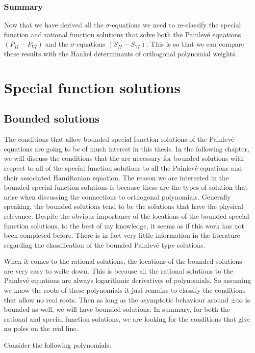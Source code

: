 \documentclass[12pt]{article}
\def\P{Painlev\'e }
\numberwithin{figure}{section}
\numberwithin{equation}{section}
\numberwithin{table}{section}
\begin{document}
\subsubsection{Summary}
Now that we have derived all the $\sigma$-equations we need to re-classify the special function and rational function solutions that solve both the \P equations $(P_{II}-P_{VI})$ and the $\sigma$-equations $(S_{II}-S_{VI})$. This is so that we can compare these results with the Hankel determinants of orthogonal polynomial weights.
\newpage\section{Special function solutions}
\subsection{Bounded solutions}
The conditions that allow bounded special function solutions of the \P equations are going to be of much interest in this thesis. In the following chapter, we will discuss the conditions that the are necessary for bounded solutions with respect to all of the special function solutions to all the \P equations and their associated Hamiltonian equation. The reason we are interested in the bounded special function solutions is because these are the types of solution that arise when discussing the connections to orthogonal polynomials. Generally speaking, the bounded solutions tend to be the solutions that have the physical relevance. Despite the obvious importance of the locations of the bounded special function solutions, to the best of my knowledge, it seems as if this work has not been completed before. There is in fact very little information in the literature regarding the classification of the bounded \P type solutions.

When it comes to the rational solutions, the locations of the bounded solutions are very easy to write down. This is because all the rational solutions to the \P equations are always logarithmic derivatives of polynomials. So assuming we know the roots of these polynomials it just remains to classify the conditions that allow no real roots. Then as long as the asymptotic behaviour around $\pm\infty$ is bounded as well, we will have bounded solutions. In summary, for both the rational and special function solutions, we are looking for the conditions that give no poles on the real line.

Consider the following polynomials:
\end{document}
